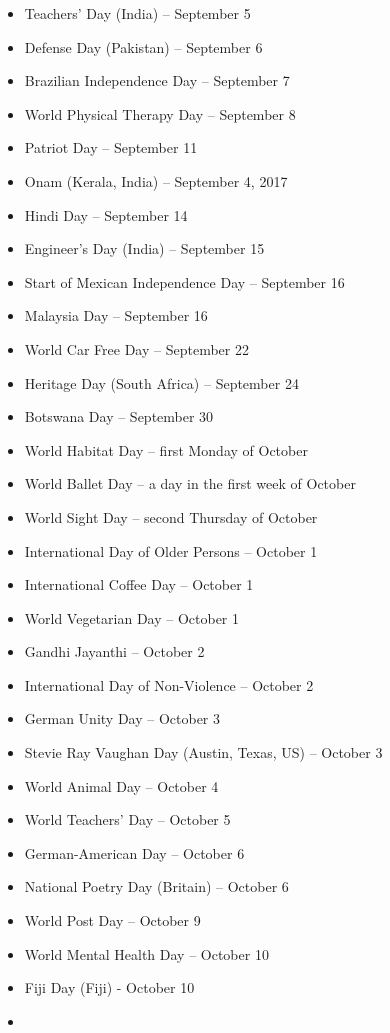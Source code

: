\documentclass[
  openany]{book}
\begin{document}
\begin{itemize}
\item
  Teachers' Day (India) -- September 5
\item
  Defense Day (Pakistan) -- September 6
\item
  Brazilian Independence Day -- September 7
\item
  World Physical Therapy Day -- September 8
\item
  Patriot Day -- September 11
\item
  Onam (Kerala, India) -- September 4, 2017
\item
  Hindi Day -- September 14
\item
  Engineer's Day (India) -- September 15
\item
  Start of Mexican Independence Day -- September 16
\item
  Malaysia Day -- September 16
\item
  World Car Free Day -- September 22
\item
  Heritage Day (South Africa) -- September 24
\item
  Botswana Day -- September 30
\item
  World Habitat Day -- first Monday of October
\item
  World Ballet Day -- a day in the first week of October
\item
  World Sight Day -- second Thursday of October
\item
  International Day of Older Persons -- October 1
\item
  International Coffee Day -- October 1
\item
  World Vegetarian Day -- October 1
\item
  Gandhi Jayanthi -- October 2
\item
  International Day of Non-Violence -- October 2
\item
  German Unity Day -- October 3
\item
  Stevie Ray Vaughan Day (Austin, Texas, US) -- October 3
\item
  World Animal Day -- October 4
\item
  World Teachers' Day -- October 5
\item
  German-American Day -- October 6
\item
  National Poetry Day (Britain) -- October 6
\item
  World Post Day -- October 9
\item
  World Mental Health Day -- October 10
\item
  Fiji Day (Fiji) - October 10
\item

\end{itemize}
\end{document}

